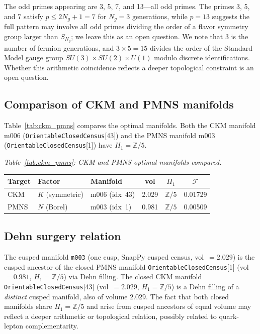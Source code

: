 \documentclass[11pt,a4paper]{article}
\begin{document}
The odd primes appearing are 3, 5, 7, and 13---all odd primes.
The primes 3, 5, and 7 satisfy $p \leq 2N_g + 1 = 7$ for $N_g = 3$
generations, while $p = 13$ suggests the full pattern may involve
all odd primes dividing the order of a flavor symmetry group larger
than $S_{N_g}$; we leave this as an open question.
We note that 3 is the number of fermion generations, and
$3 \times 5 = 15$ divides the order of the Standard Model gauge group
$SU(3)\times SU(2)\times U(1)$ modulo discrete identifications.
Whether this arithmetic coincidence reflects a deeper topological
constraint is an open question.

\subsection{Comparison of CKM and PMNS manifolds}

Table~\ref{tab:ckm_pmns} compares the optimal manifolds.
Both the CKM manifold m006 (\texttt{OrientableClosedCensus}[43])
and the PMNS manifold m003 (\texttt{OrientableClosedCensus}[1])
have $H_1 = \mathbb{Z}/5$.


\begin{center}
\textit{Table~\ref{tab:ckm_pmns}: CKM and PMNS optimal manifolds compared.}\label{tab:ckm_pmns}\\
\smallskip
\begin{tabular}{lllccc}
\toprule
Target & Factor & Manifold & vol & $H_1$ & $\mathcal{F}$ \\
\midrule
CKM  & $K$ (symmetric) & m006 (idx~43) & 2.029 & $\mathbb{Z}/5$ & 0.01729 \\
PMNS & $N$ (Borel)     & m003 (idx~1)  & 0.981 & $\mathbb{Z}/5$ & 0.00509 \\
\bottomrule
\end{tabular}
\end{center}


\subsection{Dehn surgery relation}

The cusped manifold \texttt{m003} (one cusp, SnapPy cusped census,
vol~$= 2.029$) is the cusped ancestor of the closed PMNS manifold
\texttt{OrientableClosedCensus}[1] (vol~$= 0.981$, $H_1 = \mathbb{Z}/5$)
via Dehn filling.
The closed CKM manifold \texttt{OrientableClosedCensus}[43]
(vol~$= 2.029$, $H_1 = \mathbb{Z}/5$) is a Dehn filling of a
\emph{distinct} cusped manifold, also of volume $2.029$.
The fact that both closed manifolds share $H_1 = \mathbb{Z}/5$ and
arise from cusped ancestors of equal volume may reflect a deeper
arithmetic or topological relation, possibly related to
quark-lepton complementarity.
\end{document}
